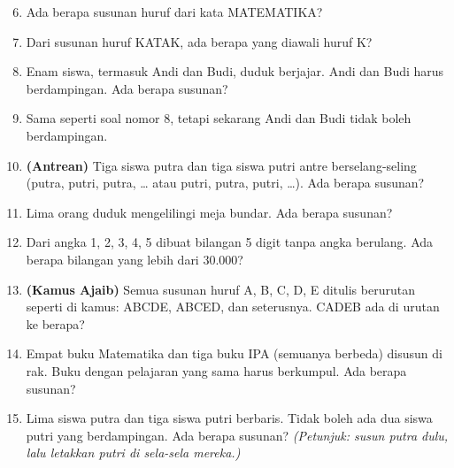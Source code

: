 \documentclass[11pt,a4paper]{article}
\begin{document}
\begin{enumerate}
  \setcounter{enumi}{5}
  \item Ada berapa susunan huruf dari kata MATEMATIKA?
  \item Dari susunan huruf KATAK, ada berapa yang diawali huruf K?
  \item Enam siswa, termasuk Andi dan Budi, duduk berjajar. Andi dan Budi harus berdampingan.
        Ada berapa susunan?
  \item Sama seperti soal nomor 8, tetapi sekarang Andi dan Budi tidak boleh berdampingan.
  \item \textbf{(Antrean)} Tiga siswa putra dan tiga siswa putri antre berselang-seling
        (putra, putri, putra, \dots{} atau putri, putra, putri, \dots). Ada berapa susunan?
\end{enumerate}

\begin{enumerate}
  \setcounter{enumi}{10}
  \item Lima orang duduk mengelilingi meja bundar. Ada berapa susunan?
  \item Dari angka 1, 2, 3, 4, 5 dibuat bilangan 5 digit tanpa angka berulang. Ada berapa
        bilangan yang lebih dari 30.000?
  \item \textbf{(Kamus Ajaib)} Semua susunan huruf A, B, C, D, E ditulis berurutan seperti di
        kamus: ABCDE, ABCED, dan seterusnya. CADEB ada di urutan ke berapa?
  \item Empat buku Matematika dan tiga buku IPA (semuanya berbeda) disusun di rak. Buku dengan
        pelajaran yang sama harus berkumpul. Ada berapa susunan?
  \item Lima siswa putra dan tiga siswa putri berbaris. Tidak boleh ada dua siswa putri yang
        berdampingan. Ada berapa susunan?
        \textit{(Petunjuk: susun putra dulu, lalu letakkan putri di sela-sela mereka.)}
\end{enumerate}
\end{document}

